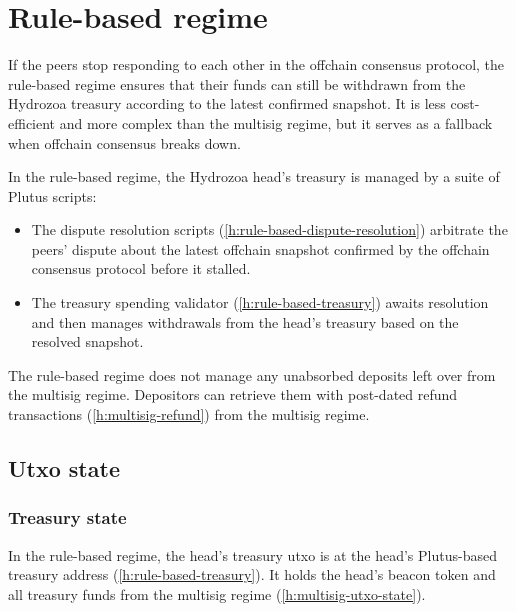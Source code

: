 \documentclass[../hydrozoa.tex]{subfiles}
\begin{document}
\section{Rule-based regime}%
\label{h:rule-based-regime}%
\newcommand{\disputeTokenNum}[0]{3477}
If the peers stop responding to each other in the offchain consensus protocol, the rule-based regime ensures that their funds can still be withdrawn from the Hydrozoa treasury according to the latest confirmed snapshot.
It is less cost-efficient and more complex than the multisig regime, but it serves as a fallback when offchain consensus breaks down.

In the rule-based regime, the Hydrozoa head's treasury is managed by a suite of Plutus scripts:
\begin{itemize}
  \item The dispute resolution scripts (\cref{h:rule-based-dispute-resolution}) arbitrate the peers' dispute about the latest offchain snapshot confirmed by the offchain consensus protocol before it stalled.
  \item The treasury spending validator (\cref{h:rule-based-treasury}) awaits resolution and then manages withdrawals from the head's treasury based on the resolved snapshot.
\end{itemize}

The rule-based regime does not manage any unabsorbed deposits left over from the multisig regime.
Depositors can retrieve them with post-dated refund transactions (\cref{h:multisig-refund}) from the multisig regime.

\subsection{Utxo state}%
\label{h:rule-based-utxo-state}

\subsubsection{Treasury state}%
\label{h:rule-based-treasury-state}
In the rule-based regime, the head's treasury utxo is at the head's Plutus-based treasury address (\cref{h:rule-based-treasury}).
It holds the head's beacon token and all treasury funds from the multisig regime (\cref{h:multisig-utxo-state}).
\end{document}
